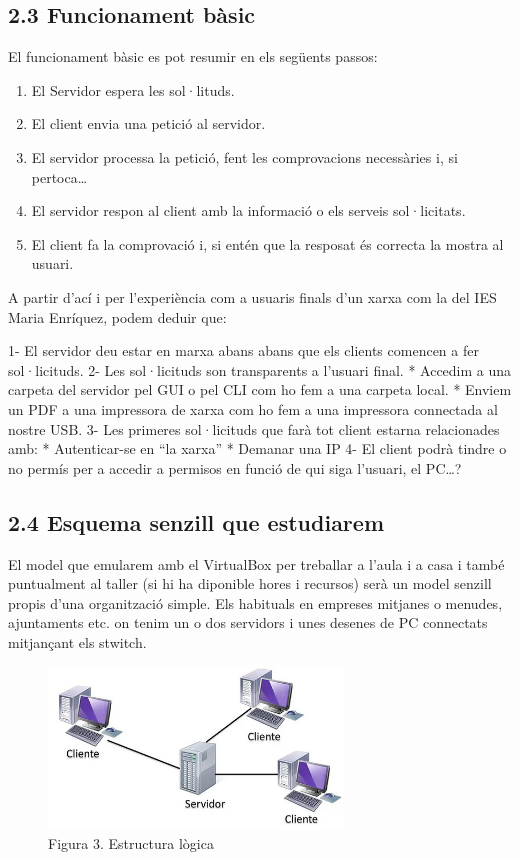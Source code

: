 \documentclass[
  a4paper,
]{article}
\providecommand{\tightlist}{%
  \setlength{\itemsep}{0pt}\setlength{\parskip}{0pt}}
\begin{document}
\subsection{2.3 Funcionament bàsic}\label{funcionament-buxe0sic}

El funcionament bàsic es pot resumir en els següents passos:

\begin{enumerate}
\def\labelenumi{\arabic{enumi}.}
\tightlist
\item
  El Servidor espera les sol·lituds.
\item
  El client envia una petició al servidor.
\item
  El servidor processa la petició, fent les comprovacions necessàries i,
  si pertoca\ldots{}
\item
  El servidor respon al client amb la informació o els serveis
  sol·licitats.
\item
  El client fa la comprovació i, si entén que la resposat és correcta la
  mostra al usuari.
\end{enumerate}

A partir d'ací i per l'experiència com a usuaris finals d'un xarxa com
la del IES Maria Enríquez, podem deduir que:

1- El servidor deu estar en marxa abans abans que els clients comencen a
fer sol·licituds. 2- Les sol·licituds son transparents a l'usuari final.
* Accedim a una carpeta del servidor pel GUI o pel CLI com ho fem a una
carpeta local. * Enviem un PDF a una impressora de xarxa com ho fem a
una impressora connectada al nostre USB. 3- Les primeres sol·licituds
que farà tot client estarna relacionades amb: * Autenticar-se en ``la
xarxa'' * Demanar una IP 4- El client podrà tindre o no permís per a
accedir a permisos en funció de qui siga l'usuari, el PC\ldots?

\subsection{2.4 Esquema senzill que
estudiarem}\label{esquema-senzill-que-estudiarem}

El model que emularem amb el VirtualBox per treballar a l'aula i a casa
i també puntualment al taller (si hi ha diponible hores i recursos) serà
un model senzill propis d'una organització simple. Els habituals en
empreses mitjanes o menudes, ajuntaments etc. on tenim un o dos
servidors i unes desenes de PC connectats mitjançant els stwitch.

\begin{figure}
\centering
\includegraphics[width=0.7\textwidth,height=\textheight]{png/cs.png}
\caption{Figura 3. Estructura lògica}
\end{figure}
\end{document}
